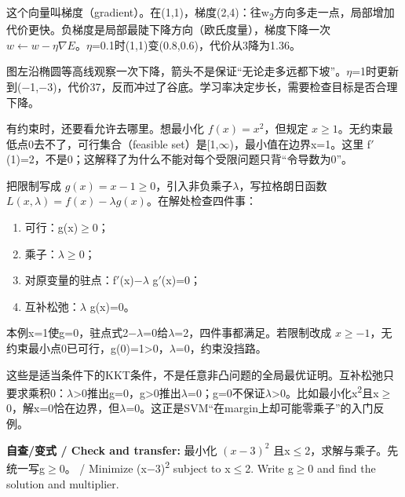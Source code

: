 这个向量叫梯度（gradient）。在(1,1)，梯度(2,4)：往w\textsubscript{2}方向多走一点，局部增加代价更快。负梯度是局部最陡下降方向（欧氏度量），梯度下降一次 \(w\leftarrow w-\eta\nabla E\)。\ensuremath{\eta}=0.1时(1,1)变(0.8,0.6)，代价从3降为1.36。




图左沿椭圆等高线观察一次下降，箭头不是保证“无论走多远都下坡”。\ensuremath{\eta}=1时更新到(\ensuremath{-}1,\ensuremath{-}3)，代价37，反而冲过了谷底。学习率决定步长，需要检查目标是否合理下降。


有约束时，还要看允许去哪里。想最小化 \(f(x)=x^2\)，但规定 \(x\ge1\)。无约束最低点0去不了，可行集合（feasible set）是[1,\ensuremath{\infty})，最小值在边界x=1。这里 f\ensuremath{\prime}(1)=2，不是0；这解释了为什么不能对每个受限问题只背“令导数为0”。


把限制写成 \(g(x)=x-1\ge0\)，引入非负乘子\ensuremath{\lambda}，写拉格朗日函数 \(L(x,\lambda)=f(x)-\lambda g(x)\)。在解处检查四件事：



\begin{enumerate}[start=1]

\item 可行：g(x)\ensuremath{\ge}0；

\item 乘子：\ensuremath{\lambda\ge}0；

\item 对原变量的驻点：f\ensuremath{\prime}(x)\ensuremath{-}\ensuremath{\lambda} g\ensuremath{\prime}(x)=0；

\item 互补松弛：\ensuremath{\lambda} g(x)=0。

\end{enumerate}


本例x=1使g=0，驻点式2\ensuremath{-}\ensuremath{\lambda}=0给\ensuremath{\lambda}=2，四件事都满足。若限制改成 \(x\ge-1\)，无约束最小点0已可行，g(0)=1>0，\ensuremath{\lambda}=0，约束没挡路。


这些是适当条件下的KKT条件，不是任意非凸问题的全局最优证明。互补松弛只要求乘积0：\ensuremath{\lambda}>0推出g=0，g>0推出\ensuremath{\lambda}=0；g=0不保证\ensuremath{\lambda}>0。比如最小化x\textsuperscript{2}且x\ensuremath{\ge}0，解x=0恰在边界，但\ensuremath{\lambda}=0。这正是SVM“在margin上却可能零乘子”的入门反例。


\textbf{自查/变式 / Check and transfer:} 最小化 \((x-3)^2\) 且x\ensuremath{\le}2，求解与乘子。先统一写g\ensuremath{\ge}0。 / Minimize (x\ensuremath{-}3)\textsuperscript{2} subject to x\ensuremath{\le}2. Write g\ensuremath{\ge}0 and find the solution and multiplier.



